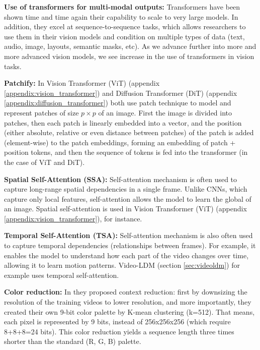\textbf{Use of transformers for multi-modal outputs:} Transformers have been shown time and time again their capability to scale to very large models. In addition, they excel at sequence-to-sequence tasks, which allows researchers to use them in their vision models and condition on multiple types of data (text, audio, image, layouts, semantic masks, etc). As we advance further into more and more advanced vision models, we see increase in the use of transformers in vision tasks.

\textbf{Patchify:} In Vision Transformer (ViT) \cite{vision_transformer} (appendix \ref{appendix:vision_transformer}) and Diffusion Transformer (DiT) \cite{diffusion_transformer} (appendix \ref{appendix:diffusion_transformer}) both use patch technique to model and represent patches of size $p \times p$ of an image. First the image is divided into patches, then each patch is linearly embedded into a vector, and the position (either absolute, relative or even distance between patches) of the patch is added (element-wise) to the patch embeddings, forming an embedding of patch + position tokens, and then the sequence of tokens is fed into the transformer (in the case of ViT and DiT). 

\textbf{Spatial Self-Attention (SSA):} Self-attention mechanism is often used to capture long-range spatial dependencies in a single frame. Unlike CNNs, which capture only local features, self-attention allows the model to learn the global of an image. Spatial self-attention is used in Vision Transformer (ViT) \cite{vision_transformer} (appendix \ref{appendix:vision_transformer}), for instance.

\textbf{Temporal Self-Attention (TSA):} Self-attention mechanism is also often used to capture temporal dependencies (relationships between frames). For example, it enables the model to understand how each part of the video changes over time, allowing it to learn motion patterns. Video-LDM \cite{video_ldm} (section \ref{sec:videoldm}) for example uses temporal self-attention.

\textbf{Color reduction:} In \cite{imagegpt} they proposed context reduction: first by downsizing the resolution of the training videos to lower resolution, and more importantly, they created their own 9-bit color palette by K-mean clustering (k=512). That means, each pixel is represented by 9 bits, instead of 256x256x256 (which require 8+8+8=24 bits). This color reduction yields a sequence length three times shorter than the standard (R, G, B) palette.

